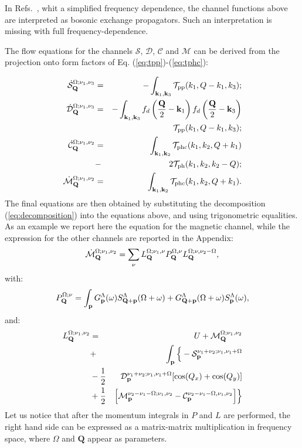 In Refs.~, whit a simplified frequency dependence, the channel functions above are interpreted as bosonic exchange propagators. Such an interpretation is missing with full frequency-dependence.

The flow equations for the channels $\mathcal{S}$,  $\mathcal{D}$, $\mathcal{C}$ and $\mathcal{M}$ can be derived from the projection onto form factors of Eq. (\ref{eq:tpp})-(\ref{eq:tphc}):

\begin{eqnarray}
\dot{\mathcal{S}}_{\mathbf{Q}}^{\Omega;\nu_1,\nu_3}  &=& - \int _{\mathbf{k}_1, \mathbf{k}_3 } \mathcal{T}_{\mathrm{pp}}(k_1,Q-k_1,k_3); \\ 
\dot{\mathcal{D}}_{\mathbf{Q}}^{\Omega;\nu_1,\nu_3}  &=& -
\int _{\mathbf{k}_1,\mathbf{k}_3}  f_d\left( {\frac{\mathbf{Q}}{2} - \mathbf{k}_1} \right ) f_d\left ({\frac{\mathbf{Q}}{2} - \mathbf{k}_3} \right)  \nonumber \\ 
 &&\mathcal{T}_{\mathrm{pp}}(k_1,Q-k_1,k_3) ; 
\\
\nonumber
\dot{\mathcal{C}}_{\mathbf{Q}}^{\Omega;\nu_1,\nu_2} &=& 
\int _{\mathbf{k}_1,\mathbf{k}_2}   \mathcal{T}_{\mathrm{phc}}(k_1,k_2,Q+k_1)\\ &-&2\mathcal{T}_{\mathrm{ph}}(k_1,k_2,k_2-Q) ; 
\\ 
\dot{\mathcal{M}}_{\mathbf{Q}}^{\Omega;\nu_1,\nu_2} & =& 
\int _{\mathbf{k}_1,\mathbf{k}_2}  \mathcal{T}_{\mathrm{phc}}(k_1,k_2,Q+k_1). 
\end{eqnarray}
The final equations are then obtained by substituting the decomposition (\ref{eq:decomposition}) into the equations above, and using trigonometric equalities.
As an example we report here the equation for the magnetic channel, while the expression for the other channels are reported in the Appendix: 
\begin{equation}
\dot{\mathcal{M}}_{\mathbf{Q}}^{\Omega;\nu_1,\nu_2} = \sum_{\nu} L^{\Omega; \nu_1,\nu}_{\mathbf{Q}} P_{\mathbf{Q}}^{\Omega,\nu} L^{\Omega; \nu,\nu_2-\Omega}_{\mathbf{Q}}, 
\end{equation} 	   
with: 
\begin{equation}
P_{\mathbf{Q}}^{\Omega;\nu} = \int_{\mathbf{p}}  G^\Lambda_{\mathbf{p}}(\omega)S^\Lambda_{\mathbf{Q}+\mathbf{p}}
(\Omega+\omega) +G^\Lambda_{\mathbf{Q}+\mathbf{p}}(\Omega+\omega)
S^\Lambda_{\mathbf{p}} (\omega), 
\end{equation} 
and: 
\begin{eqnarray} 
\nonumber
L^{\Omega;\nu_1,\nu_2}_{\mathbf{Q}}&=&U+\mathcal{M}_{\mathbf{Q}}^{\Omega;\nu_1,\nu_2} \\
\nonumber 
&+& \int_{\mathbf{p}} \Big \{- \mathcal{S}_{\mathbf{p}}^{\nu_1+\nu_2;\nu_1,\nu_1+\Omega}  
 \\
 \nonumber 
&-\frac{1}{2}& \mathcal{D}_{\mathbf{p}}^{\nu_1+\nu_2;\nu_1,\nu_1+\Omega}
[\cos(Q_x)+\cos(Q_y)]
 \\ 
&+\frac{1}{2}& \Big[  \mathcal{M}_{\mathbf{p}}^{\nu_2-\nu_1-\Omega; \nu_1,\nu_2} 
- \mathcal{C}_{\mathbf{p}}^{\nu_2-\nu_1-\Omega,\nu_1,\nu_2} \Big] 
\Big \} 
\end{eqnarray}	 
Let us notice that after the momentum integrals in $P$ and $L$ are performed, the right hand side can be expressed as a matrix-matrix multiplication in frequency space, where $\Omega$ and $\mathbf{Q}$ appear as parameters.

